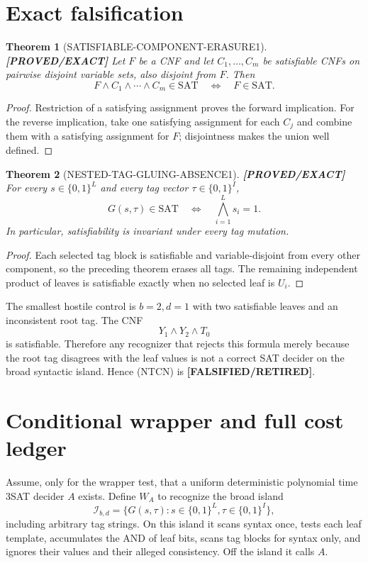 \documentclass[11pt]{article}
\newtheorem{theorem}{Theorem}
\newcommand{\SAT}{\mathrm{SAT}}
\newcommand{\status}[1]{\textbf{[#1]}}
\begin{document}
\section{Exact falsification}

\begin{theorem}[SATISFIABLE-COMPONENT-ERASURE1]
\status{PROVED/EXACT} Let $F$ be a CNF and let $C_1,\ldots,C_m$ be
satisfiable CNFs on pairwise disjoint variable sets, also disjoint from
$F$.  Then
\[
F\wedge C_1\wedge\cdots\wedge C_m\in\SAT
\quad\Longleftrightarrow\quad F\in\SAT .
\]
\end{theorem}
\begin{proof}
Restriction of a satisfying assignment proves the forward implication.
For the reverse implication, take one satisfying assignment for each
$C_j$ and combine them with a satisfying assignment for $F$; disjointness
makes the union well defined.
\end{proof}

\begin{theorem}[NESTED-TAG-GLUING-ABSENCE1]
\status{PROVED/EXACT} For every $s\in\{0,1\}^{L}$ and every tag vector
$\tau\in\{0,1\}^{I}$,
\[
G(s,\tau)\in\SAT\quad\Longleftrightarrow\quad
\bigwedge_{i=1}^{L}s_i=1.
\]
In particular, satisfiability is invariant under every tag mutation.
\end{theorem}
\begin{proof}
Each selected tag block is satisfiable and variable-disjoint from every
other component, so the preceding theorem erases all tags.  The remaining
independent product of leaves is satisfiable exactly when no selected leaf
is $U_i$.
\end{proof}

The smallest hostile control is $b=2,d=1$ with two satisfiable leaves and
an inconsistent root tag.  The CNF
\[
Y_1\wedge Y_2\wedge T_{0}
\]
is satisfiable.  Therefore any recognizer that rejects this formula merely
because the root tag disagrees with the leaf values is not a correct SAT
decider on the broad syntactic island.  Hence (NTCN) is
\status{FALSIFIED/RETIRED}.

\section{Conditional wrapper and full cost ledger}

Assume, only for the wrapper test, that a uniform deterministic polynomial
time 3SAT decider $A$ exists.  Define $W_A$ to recognize the broad island
\[
\mathcal I_{b,d}=\{G(s,\tau):s\in\{0,1\}^{L},
\tau\in\{0,1\}^{I}\},
\]
including arbitrary tag strings.  On this island it scans syntax once,
tests each leaf template, accumulates the AND of leaf bits, scans tag blocks
for syntax only, and ignores their values and their alleged consistency.
Off the island it calls $A$.
\end{document}
